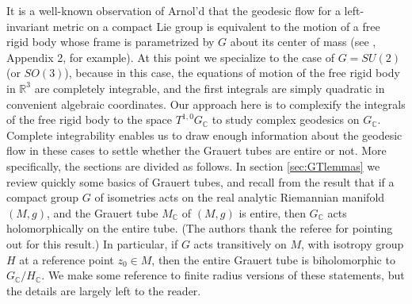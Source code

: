 \documentclass[12pt,reqno]{amsart}\usepackage{amssymb,amsmath,amscd,epsfig,amsthm,enumerate,import,eufrak}
\theoremstyle{definition}
\theoremstyle{remark}
\numberwithin{equation}{section}
\theoremstyle{plain}
\theoremstyle{definition}
\def \r {\mathbb{R}}
\def \c {\mathbb{C}}
\def \vs {\vskip 2mm}
\theoremstyle{remark}
\numberwithin{theorem}{section}
\begin{document}
It is a well-known observation of Arnol'd that the geodesic flow for a left-invariant metric on a compact Lie group is equivalent to the motion of a free rigid body whose frame is parametrized by $G$ about its center of mass (see \cite{via}, Appendix 2, for example). At this point we specialize to the case of $G = SU(2)$ (or $SO(3)$), because in this case, the equations of motion of the free rigid body in $\r^3$ are completely integrable, and the first integrals are simply quadratic in convenient algebraic coordinates. Our approach here is to complexify the integrals of the free rigid body to the space $T^{1,0}G_{\c}$ to study complex geodesics on $G_{\c}$. Complete integrability enables us to draw enough information about the geodesic flow in these cases to settle whether the Grauert tubes are entire or not. 
\vs
%
More specifically, the sections are divided as follows. In section \ref{sec:GTlemmas} we review quickly some basics of Grauert tubes, and recall from \cite{s3} the result that if a compact group $G$ of isometries acts on the real analytic Riemannian manifold $(M, g)$, and the Grauert tube $M_{\c}$ of $(M, g)$ is entire, then $G_{\c}$ acts holomorphically on the entire tube. (The authors thank the referee for pointing out \cite{s3} for this result.) In particular, if $G$ acts transitively on $M$, with isotropy group $H$ at a reference point $z_0 \in M$, then the entire Grauert tube is biholomorphic to $G_{\c}/H_{\c}.$ We make some reference to finite radius versions of these statements, but the details are largely left to the reader.
\end{document}
